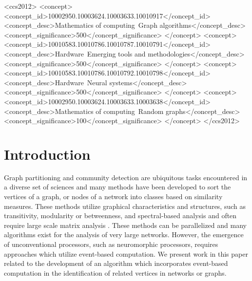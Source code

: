 \documentclass[sigconf]{acmart}
\begin{document}
\begin{CCSXML}
<ccs2012>
<concept>
<concept_id>10002950.10003624.10003633.10010917</concept_id>
<concept_desc>Mathematics of computing~Graph algorithms</concept_desc>
<concept_significance>500</concept_significance>
</concept>
<concept>
<concept_id>10010583.10010786.10010787.10010791</concept_id>
<concept_desc>Hardware~Emerging tools and methodologies</concept_desc>
<concept_significance>500</concept_significance>
</concept>
<concept>
<concept_id>10010583.10010786.10010792.10010798</concept_id>
<concept_desc>Hardware~Neural systems</concept_desc>
<concept_significance>500</concept_significance>
</concept>
<concept>
<concept_id>10002950.10003624.10003633.10003638</concept_id>
<concept_desc>Mathematics of computing~Random graphs</concept_desc>
<concept_significance>100</concept_significance>
</concept>
</ccs2012>
\end{CCSXML}






\maketitle

\section{Introduction}
\label{sec:Introduction}
Graph partitioning and community detection are ubiquitous tasks encountered in a diverse set of sciences and many methods have been developed to sort the vertices of a graph, or nodes of a network into classes based on similarity measures. These methods utilize graphical characteristics and structures, such as transitivity, modularity or betweenness, and spectral-based analysis and often require large scale matrix analysis \cite{boccaletti2006complex,fortunato2010community,malliaros2013clustering,PhysRevE.70.066111}. These methods can be parallelized and many algorithms exist for the analysis of very large networks. However, the emergence of unconventional processors, such as neuromorphic processors, requires approaches which utilize event-based computation. We present work in this paper related to the development of an algorithm which incorporates event-based computation in the identification of related vertices in networks or graphs.  
\end{document}
